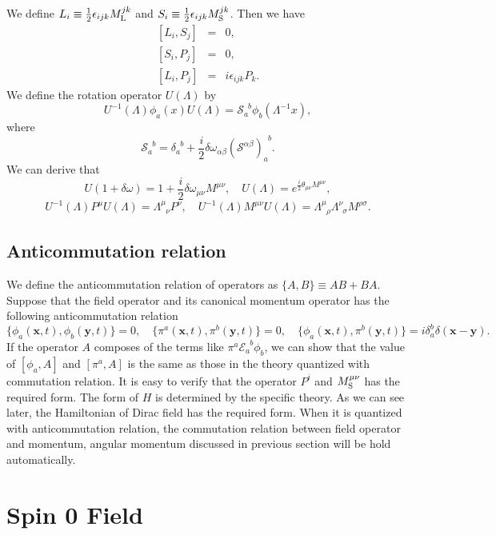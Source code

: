 We define $L_i \equiv \frac{1}{2} \epsilon_{ijk} M_{\rm L}^{jk}$ and $S_i \equiv \frac{1}{2} \epsilon_{ijk} M_{\rm S}^{jk}$. Then we have
\begin{eqnarray}
\left[L_i,S_j\right] &=& 0 ,\nonumber \\
\left[S_i,P_j\right] &=& 0 ,\nonumber \\
\left[L_i,P_j\right] &=& i\epsilon_{ijk}P_k .\nonumber
\end{eqnarray}
We define the rotation operator $U(\Lambda)$ by
\[U^{-1}(\Lambda) \phi_a(x) U(\Lambda) = \mathscr{S}_{a}^{\phantom{a}b}\phi_b(\Lambda^{-1}x),\]
where
\[\mathscr{S}_{a}^{\phantom{a}b} = \delta_{a}^{\phantom{a}b}+\frac{i}{2} \delta \omega_{\alpha \beta} (\mathcal{S}^{\alpha \beta})_{a}^{\phantom{a}b} .\]
We can derive that
\[U(1+\delta \omega) = 1 + \frac{i}{2} \delta \omega_{\mu \nu} M^{\mu \nu} , \quad U(\Lambda) = e^{\frac{i}{2} \theta_{\mu \nu} M^{\mu \nu}},\]
\[U^{-1}(\Lambda) P^{\mu} U(\Lambda) = \Lambda^{\mu}_{\phantom{\mu}\nu} P^{\nu}, \quad U^{-1}(\Lambda) M^{\mu \nu} U(\Lambda) = \Lambda^{\mu}_{\phantom{\mu}\rho} \Lambda^{\nu}_{\phantom{\nu}\sigma}M^{\rho \sigma}.\]

\section{Anticommutation relation}
\noindent
We define the anticommutation relation of operators as $\{A,B\} \equiv AB + BA$. Suppose that the field operator and its canonical momentum operator has the following anticommutation relation
\[\{\phi_a(\bm{x},t),\phi_b(\bm{y},t)\} = 0 , \quad \{\pi^a(\bm{x},t),\pi^b(\bm{y},t)\} = 0 , \quad \{\phi_a(\bm{x},t),\pi^b(\bm{y},t)\} = i \delta_a^b \delta(\bm{x}-\bm{y}) .\]
If the operator $A$ composes of the terms like $\pi^a \mathcal{E}_a^{\phantom{a}b} \phi_b$, we can show that the value of $[\phi_a,A]$ and $[\pi^a,A]$ is the same as those in the theory quantized with commutation relation. It is easy to verify that the operator $P^i$ and $M_{\rm S}^{\mu \nu}$ has the required form. The form of $H$ is determined by the specific theory. As we can see later, the Hamiltonian of Dirac field  has the required form. When it is quantized with anticommutation relation, the commutation relation between field operator and momentum, angular momentum discussed in previous section will be hold automatically. 

\chapter{Spin 0 Field}
